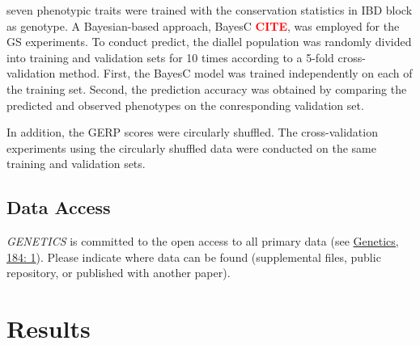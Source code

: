 \documentclass[9pt,twocolumn,twoside]{gsajnl}
\newcommand{\sme}[1]{\textcolor{red}{\bf #1}}
\begin{document}
seven phenotypic traits were trained with the conservation statistics in IBD block as genotype.
A Bayesian-based approach, BayesC \sme{CITE}, was employed for the GS experiments. To conduct predict, the diallel population was randomly divided into training and validation sets for 10 times according to a 5-fold cross-validation method. First, the BayesC model was trained independently on each of the training set. Second, the prediction accuracy was obtained by comparing the predicted and observed phenotypes on the conresponding validation set. 

In addition, the GERP scores were circularly shuffled. The cross-validation experiments using the circularly shuffled data were conducted on the same training and validation sets.  

\subsection*{Data Access}

\textit{GENETICS} is committed to the open access to all primary data (see \href{http://www.genetics.org/content/184/1/1.full}{Genetics, 184: 1}). Please indicate where data can be found (supplemental files, public repository, or published with another paper).



\section*{Results}

\end{document}
